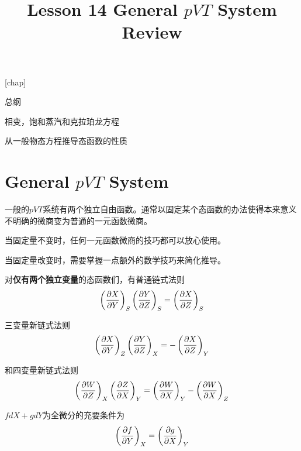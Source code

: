 \documentclass[CJK]{beamer}
\title{Lesson 14 General $pVT$ System Review}
\author{}
\date{}
\begin{document}


[chap]
\def\proid{{Problem \thechap.\theproblem}}

\begin{frame}
  \bch
  \bitem
\item{总纲}
\item{相变，饱和蒸汽和克拉珀龙方程}
\item{从一般物态方程推导态函数的性质}
  \eitem
  \ech
\end{frame}


\section{General $pVT$ System}
\setcounter{chap}{2}
\setcounter{problem}{0}

\begin{frame}
  \bch
  \bitem
  \item{一般的$pVT$系统有两个独立自由函数。通常以固定某个态函数的办法使得本来意义不明确的微商变为普通的一元函数微商。}
  \item{  当固定量不变时，任何一元函数微商的技巧都可以放心使用。}
  \item{
    当固定量改变时，需要掌握一点额外的数学技巧来简化推导。}
    \eitem
  
  \ech
\end{frame}

\begin{frame}
  \bch
  对{\bf 仅有两个独立变量}的态函数们，有普通链式法则
  $$\left(\frac{\partial X}{\partial Y}\right)_{S} \left(\frac{\partial Y}{\partial Z}\right)_{S} = \left(\frac{\partial X}{\partial Z}\right)_{S}$$

  三变量新链式法则
  $$\left(\frac{\partial X}{\partial Y}\right)_{Z} \left(\frac{\partial Y}{\partial Z}\right)_{X} = -\left(\frac{\partial X}{\partial Z}\right)_{Y}$$

  和四变量新链式法则
  $$ \left(\frac{\partial W}{\partial Z}\right)_{X} \left(\frac{\partial Z}{\partial X}\right)_{Y} = \left(\frac{\partial W}{\partial X}\right)_{Y} - \left(\frac{\partial W}{\partial X}\right)_{Z}  $$
  
  \ech
\end{frame}


\begin{frame}
  \bch
  $ f dX + g dY$为全微分的充要条件为
  $$\left(\frac{\partial f}{\partial Y}\right)_{X} = \left(\frac{\partial g}{\partial X}\right)_{Y} $$
  
  \ech
\end{frame}


\begin{frame}
  \bch
  \ech
\end{frame}
\end{document}
